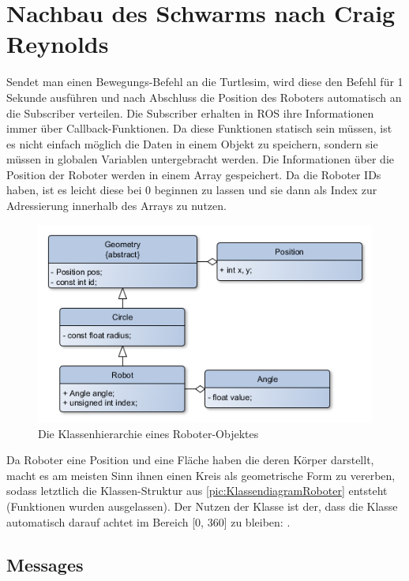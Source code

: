 \section{Nachbau des Schwarms nach Craig Reynolds}

Sendet man einen Bewegungs-Befehl an die Turtlesim, wird diese den Befehl für 1 Sekunde ausführen und nach Abschluss die Position des Roboters automatisch an die Subscriber verteilen. Die Subscriber erhalten in ROS ihre Informationen immer über Callback-Funktionen. Da diese Funktionen statisch sein müssen, ist es nicht einfach möglich die Daten in einem Objekt zu speichern, sondern sie müssen in globalen Variablen untergebracht werden.
Die Informationen über die Position der Roboter werden in einem Array gespeichert. Da die Roboter IDs haben, ist es leicht diese bei 0 beginnen zu lassen und sie dann als Index zur Adressierung innerhalb des Arrays zu nutzen.

\begin{figure}
	\includegraphics[width=\pictureWidthBig,keepaspectratio]{graphics/Klassendiagramme/KlassendiagrammRobot.png}
	\caption{Die Klassenhierarchie eines Roboter-Objektes}
	\label{pic:KlassendiagramRoboter}
\end{figure}

Da Roboter eine Position und eine Fläche haben die deren Körper darstellt, macht es am meisten Sinn ihnen einen Kreis als geometrische Form zu vererben, sodass letztlich die Klassen-Struktur aus \autoref{pic:KlassendiagramRoboter} entsteht (Funktionen wurden ausgelassen). Der Nutzen der Klasse  ist der, dass die Klasse automatisch darauf achtet im Bereich [0, 360] zu bleiben: .

\subsection*{Messages}

